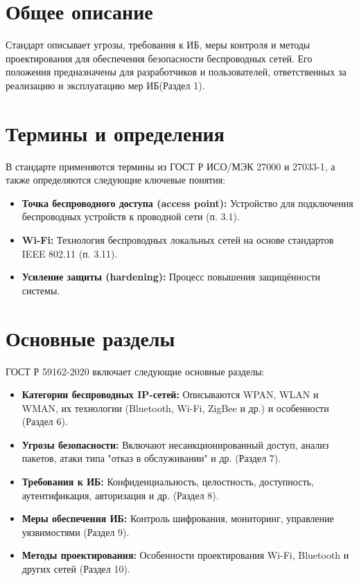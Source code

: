 \section*{Общее описание}
Стандарт описывает угрозы, требования к ИБ, меры контроля и методы проектирования для обеспечения безопасности беспроводных сетей.
Его положения предназначены для разработчиков и пользователей, ответственных за реализацию и эксплуатацию мер ИБ(Раздел 1).

\section*{Термины и определения}
В стандарте применяются термины из ГОСТ Р ИСО/МЭК 27000 и 27033-1, а также определяются следующие ключевые понятия:
\begin{itemize}
    \item \textbf{Точка беспроводного доступа (access point):} Устройство для подключения беспроводных устройств к проводной сети (п. 3.1).
    \item \textbf{Wi-Fi:} Технология беспроводных локальных сетей на основе стандартов IEEE 802.11 (п. 3.11).
    \item \textbf{Усиление защиты (hardening):} Процесс повышения защищённости системы.
\end{itemize}

\section*{Основные разделы}
ГОСТ Р 59162-2020 включает следующие основные разделы:
\begin{itemize}
    \item \textbf{Категории беспроводных IP-сетей:} Описываются WPAN, WLAN и WMAN, их технологии (Bluetooth, Wi-Fi, ZigBee и др.) и особенности (Раздел 6).
    \item \textbf{Угрозы безопасности:} Включают несанкционированный доступ, анализ пакетов, атаки типа "отказ в обслуживании" и др. (Раздел 7).
    \item \textbf{Требования к ИБ:} Конфиденциальность, целостность, доступность, аутентификация, авторизация и др. (Раздел 8).
    \item \textbf{Меры обеспечения ИБ:} Контроль шифрования, мониторинг, управление уязвимостями (Раздел 9).
    \item \textbf{Методы проектирования:} Особенности проектирования Wi-Fi, Bluetooth и других сетей (Раздел 10).
\end{itemize}

